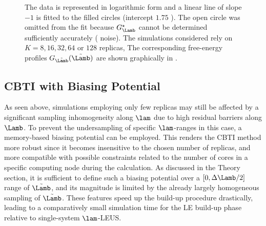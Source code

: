 \begin{figure}
    \centering
    
    \caption{\footnotesize
%
%
      The data is represented in logarithmic form and a linear line of slope $-1$ is fitted to the filled 
      circles (intercept $1.75$ ). The open circle was omitted 
      from the fit because  $G^\star_{\Lamb}$ cannot be determined sufficiently accurately ( noise).
      The simulations considered rely on $K=8,16,32,64$ or $128$ replicas,
%
      The corresponding free-energy profiles $G_{\tilde{\Lamb}}(\tilde{\Lamb})$ are shown graphically in .
   }
\label{fig:deltag}
\end{figure}

\subsection{CBTI with Biasing Potential}

As seen above, simulations employing only few replicas may still be affected by a
significant sampling inhomogeneity along $\lam$ due to high residual barriers along $\Lamb$.
To prevent the undersampling of specific $\lam$-ranges in this case,
a memory-based biasing potential can be employed. This renders the CBTI 
method more robust since it becomes insensitive to the chosen number of replicas,
and more compatible with possible constraints related to \eg{} the number of cores in a specific computing 
node during the calculation.
%
As discussed in the Theory section, it is sufficient to define such a biasing potential 
over a $[0,\Delta \Lamb / 2]$ range of $\tilde{\Lamb}$,
and its magnitude is limited by the already largely homogeneous sampling of $\tilde{\Lamb}$.
These features speed up the build-up procedure drastically, leading to a comparatively small
 simulation time for the LE build-up phase relative to single-system $\lam$-LEUS.



